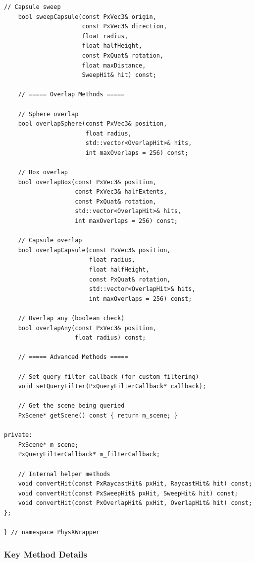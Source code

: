 \begin{lstlisting}[style=cpp, caption=GeometryQuery Conceptual Interface]
    // Capsule sweep
    bool sweepCapsule(const PxVec3& origin,
                      const PxVec3& direction,
                      float radius,
                      float halfHeight,
                      const PxQuat& rotation,
                      float maxDistance,
                      SweepHit& hit) const;

    // ===== Overlap Methods =====

    // Sphere overlap
    bool overlapSphere(const PxVec3& position,
                       float radius,
                       std::vector<OverlapHit>& hits,
                       int maxOverlaps = 256) const;

    // Box overlap
    bool overlapBox(const PxVec3& position,
                    const PxVec3& halfExtents,
                    const PxQuat& rotation,
                    std::vector<OverlapHit>& hits,
                    int maxOverlaps = 256) const;

    // Capsule overlap
    bool overlapCapsule(const PxVec3& position,
                        float radius,
                        float halfHeight,
                        const PxQuat& rotation,
                        std::vector<OverlapHit>& hits,
                        int maxOverlaps = 256) const;

    // Overlap any (boolean check)
    bool overlapAny(const PxVec3& position,
                    float radius) const;

    // ===== Advanced Methods =====

    // Set query filter callback (for custom filtering)
    void setQueryFilter(PxQueryFilterCallback* callback);

    // Get the scene being queried
    PxScene* getScene() const { return m_scene; }

private:
    PxScene* m_scene;
    PxQueryFilterCallback* m_filterCallback;

    // Internal helper methods
    void convertHit(const PxRaycastHit& pxHit, RaycastHit& hit) const;
    void convertHit(const PxSweepHit& pxHit, SweepHit& hit) const;
    void convertHit(const PxOverlapHit& pxHit, OverlapHit& hit) const;
};

} // namespace PhysXWrapper
\end{lstlisting}

\subsubsection{Key Method Details}


